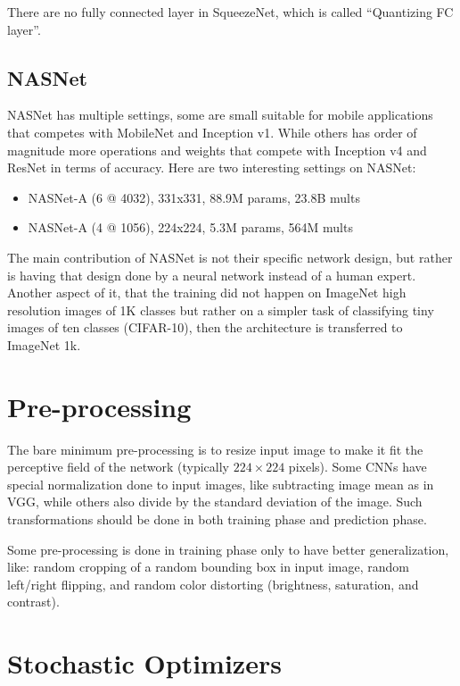 There are no fully connected layer in SqueezeNet, which is called ``Quantizing FC layer''\autocite{wu2016quantized}.

\subsection{NASNet}

NASNet\autocite{zoph2017learning} has multiple settings, some are small suitable for
mobile applications that competes with MobileNet and Inception v1.
While others has order of magnitude more operations and weights that compete with Inception v4 and ResNet in terms of accuracy. 
Here are two interesting settings on NASNet:

\begin{itemize}
\item NASNet-A (6 @ 4032), 331x331, 88.9M params, 23.8B mults
\item NASNet-A (4 @ 1056), 224x224, 5.3M params, 564M mults
\end{itemize}

The main contribution of NASNet is not their specific network design,
but rather is having that design done by a neural network instead of a human expert.
Another aspect of it, that the training did not happen on ImageNet high resolution images of 1K classes
but rather on a simpler task of classifying tiny images of ten classes (CIFAR-10),
then the architecture is transferred to ImageNet 1k.

\section{Pre-processing}

The bare minimum pre-processing is to resize input image to make it
fit the perceptive field of the network (typically \(224\times 224\) pixels).
Some CNNs have special normalization done to input images,
like subtracting image mean as in VGG\autocite{simonyan2014very},
while others also divide by the standard deviation of the image.
Such transformations should be done in both training phase and prediction phase.

Some pre-processing is done in training phase only to have better generalization, like:
random cropping of a random bounding box in input image, 
random left/right flipping, and random color distorting (brightness, saturation, and contrast).

\section{Stochastic Optimizers}

